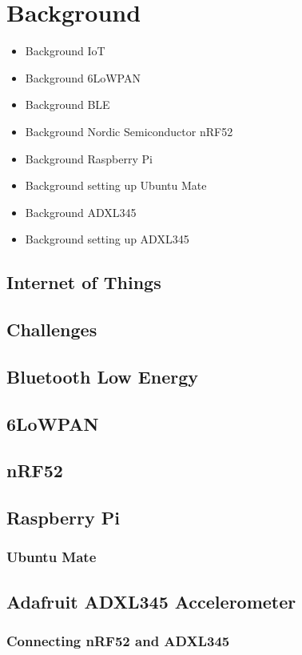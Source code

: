 \chapter{Background}
\label{chp:background} 

\begin{itemize}
  \item Background IoT
  \item Background 6LoWPAN
  \item Background BLE
  \item Background Nordic Semiconductor nRF52
  \item Background Raspberry Pi
  \item Background setting up Ubuntu Mate
  \item Background ADXL345
  \item Background setting up ADXL345
\end{itemize}


\section{Internet of Things}



\section{Challenges}

\section{Bluetooth Low Energy}

\section{6LoWPAN}

\section{nRF52}

\section{Raspberry Pi}

\subsection{Ubuntu Mate}

\section{Adafruit ADXL345 Accelerometer}

\subsection{Connecting nRF52 and ADXL345}


